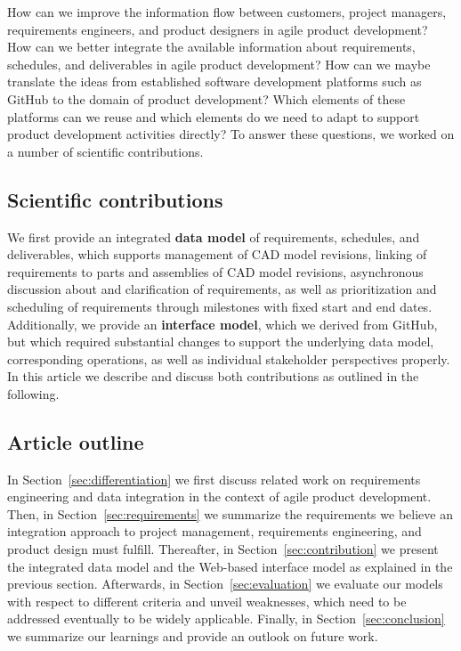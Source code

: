 How can we improve the information flow between customers, project managers, requirements engineers, and product designers in agile product development?
How can we better integrate the available information about requirements, schedules, and deliverables in agile product development?
How can we maybe translate the ideas from established software development platforms such as GitHub to the domain of product development?
Which elements of these platforms can we reuse and which elements do we need to adapt to support product development activities directly?
To answer these questions, we worked on a number of scientific contributions.

\subsection{Scientific contributions}

We first provide an integrated \textbf{data model} of requirements, schedules, and deliverables, which supports management of CAD model revisions, linking of requirements to parts and assemblies of CAD model revisions, asynchronous discussion about and clarification of requirements, as well as prioritization and scheduling of requirements through milestones with fixed start and end dates.
Additionally, we provide an \textbf{interface model}, which we derived from GitHub, but which required substantial changes to support the underlying data model, corresponding operations, as well as individual stakeholder perspectives properly.
In this article we describe and discuss both contributions as outlined in the following.

\subsection{Article outline}

In Section~\ref{sec:differentiation} we first discuss related work on requirements engineering and data integration in the context of agile product development.
Then, in Section~\ref{sec:requirements} we summarize the requirements we believe an integration approach to project management, requirements engineering, and product design must fulfill.
Thereafter, in Section~\ref{sec:contribution} we present the integrated data model and the Web-based interface model as explained in the previous section.
Afterwards, in Section~\ref{sec:evaluation} we evaluate our models with respect to different criteria and unveil weaknesses, which need to be addressed eventually to be widely applicable.
Finally, in Section~\ref{sec:conclusion} we summarize our learnings and provide an outlook on future work.